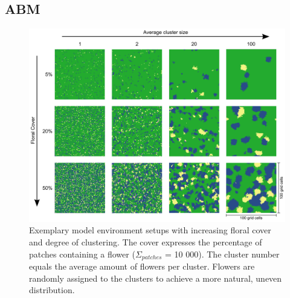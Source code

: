 \label{ch:appendix_ABM}

\newpage
\subsection{ABM}

\begin{figure} [H] %
\centering
\includegraphics[width=15cm]{Images/cluster}
 \caption{ Exemplary model environment setups with increasing floral cover and degree of clustering. The cover expresses the percentage of patches containing a flower ($\Sigma_{patches}$ = 10 000). The cluster number equals the average amount of flowers per cluster. Flowers are randomly assigned to the clusters to achieve a more natural, uneven distribution. }
 \label{fig:cluster}
\end{figure}

\newpage


